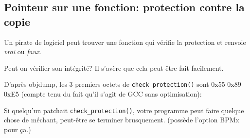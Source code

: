 \subsection{Pointeur sur une fonction: protection contre la copie}
\myindex{\SoftwareCracking}

Un pirate de logiciel peut trouver une fonction qui vérifie la protection et renvoie
\emph{vrai} ou \emph{faux}.

Peut-on vérifier son intégrité?
Il s'avère que cela peut être fait facilement.

D'après objdump, les 3 premiers octets de \verb|check_protection()| sont 0x55 0x89 0xE5
(compte tenu du fait qu'il s'agit de GCC sans optimisation):





Si quelqu'un patchait \verb|check_protection()|, votre programme peut faire quelque
chose de méchant, peut-être se terminer brusquement.
(\tracer possède l'option BPMx pour ça.)


